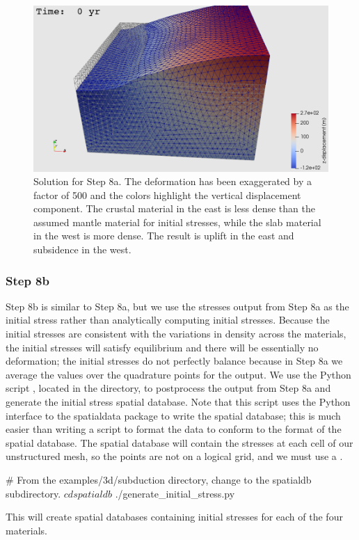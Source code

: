 \begin{figure}
  \includegraphics[width=4.5in]{examples/figs/subduction3d_step08a_soln}
  \caption{Solution for Step 8a. The deformation has been exaggerated
    by a factor of 500 and the colors highlight the vertical
    displacement component. The crustal material in the
    east is less dense than the assumed mantle material for initial
    stresses, while the slab material in the west is more dense. The
    result is uplift in the east and subsidence in the west.}
  \label{fig:example:subduction:3d:step08a}
\end{figure}

\subsubsection{Step 8b}

Step 8b is similar to Step 8a, but we use the stresses output from
Step 8a as the initial stress rather than analytically computing
initial stresses. Because the initial stresses are consistent with the
variations in density across the materials, the initial stresses will
satisfy equilibrium and there will be essentially no deformation; the
initial stresses do not perfectly balance because in Step 8a we
average the values over the quadrature points for the output. We use
the Python script , located in
the  directory, to postprocess the output from
Step 8a and generate the initial stress spatial database. Note that
this script uses the Python interface to the spatialdata package to
write the spatial database; this is much easier than writing a script
to format the data to conform to the format of the spatial
database. The spatial database will contain the stresses at each cell
of our unstructured mesh, so the points are not on a logical grid, and
we must use a .
\begin{shell}
# From the examples/3d/subduction directory, change to the spatialdb subdirectory.
$ cd spatialdb
$ ./generate_initial_stress.py
\end{shell}
This will create spatial databases containing initial stresses for
each of the four materials.


